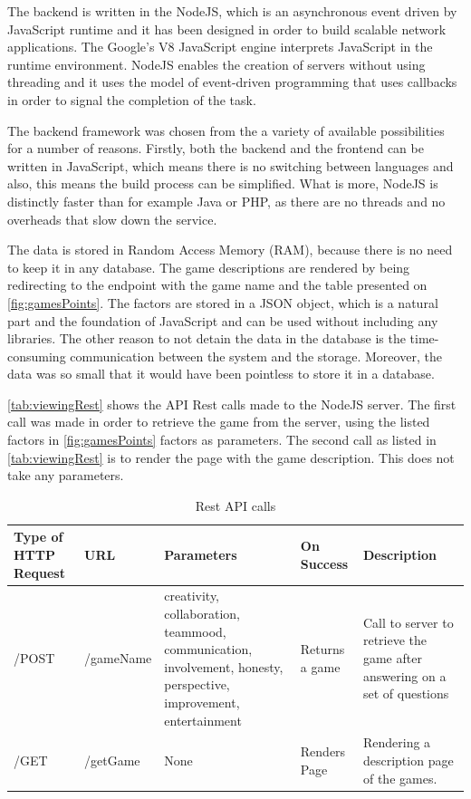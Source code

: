 The backend is written in the NodeJS, which is an asynchronous event driven by JavaScript runtime and it has been designed in order to build scalable network applications. The Google's V8 JavaScript engine interprets JavaScript in the runtime environment. NodeJS enables the creation of servers without using threading and it uses the model of event-driven programming that uses callbacks in order to signal the completion of the task.

The backend framework was chosen from the a variety of available possibilities for a number of reasons. Firstly, both the backend and the frontend can be written in JavaScript, which means there is no switching between languages and also, this means the build process can be simplified. What is more, NodeJS is distinctly faster than for example Java or PHP, as there are no threads and no overheads that slow down the service.

The data is stored in Random Access Memory (RAM), because there is no need to keep it in any database. The game descriptions are rendered by being redirecting to the endpoint with the game name and the table presented on \autoref{fig:gamesPoints}. The factors are stored in a JSON object, which is a natural part and the foundation of JavaScript and can be used without including any libraries. The other reason to not detain the data in the database is the time-consuming communication between the system and the storage. Moreover, the data was so small that it would have been pointless to store it in a database. 

\autoref{tab:viewingRest} shows the API Rest calls made to the NodeJS server. The first call was made in order to retrieve the game from the server, using the listed factors in \autoref{fig:gamesPoints} factors as parameters. The second call as listed in \autoref{tab:viewingRest} is to render the page with the game description. This does not take any parameters.

\begin{table}[h]
	\caption{Rest API calls}
	\label{tab:viewingRest}
	\begin{tabularx}{\textwidth}{|X|X|X|X|X|}
	\hline
		Type of HTTP Request & URL & Parameters & On Success & Description \\ \hline
		/POST &  /{gameName} & creativity, collaboration, teammood, communication, involvement, honesty, perspective, improvement, entertainment & Returns a game & Call  to  server  to retrieve the game after answering  on a set of questions \\ \hline
		/GET & /getGame & None & Renders Page & Rendering a description page of the games. \\ \hline
	\end{tabularx}
\end{table}

